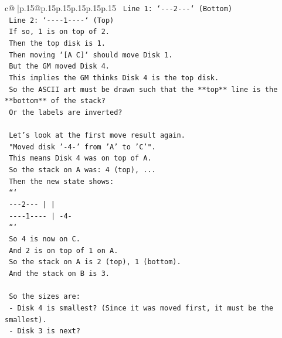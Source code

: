 \documentclass{article}
\begin{document}
{\begin{supertabular}{c@{$\;$}|p{.15\linewidth}@{}p{.15\linewidth}p{.15\linewidth}p{.15\linewidth}p{.15\linewidth}p{.15\linewidth}}
{{{\texttt{                Line 1: `{-}{-}{-}2{-}{-}{-}` (Bottom)} \\
\texttt{                Line 2: `{-}{-}{-}{-}1{-}{-}{-}{-}` (Top)} \\
\texttt{                If so, 1 is on top of 2.} \\
\texttt{                Then the top disk is 1.} \\
\texttt{                Then moving `{[}A C{]}` should move Disk 1.} \\
\texttt{                But the GM moved Disk 4.} \\
\texttt{                This implies the GM thinks Disk 4 is the top disk.} \\
\texttt{                So the ASCII art must be drawn such that the **top** line is the **bottom** of the stack?} \\
\texttt{                Or the labels are inverted?} \\
\\ 
\texttt{                Let's look at the first move result again.} \\
\texttt{                "Moved disk '{-}4{-}' from 'A' to 'C'".} \\
\texttt{                This means Disk 4 was on top of A.} \\
\texttt{                So the stack on A was: 4 (top), ...} \\
\texttt{                Then the new state shows:} \\
\texttt{                ```} \\
\texttt{                {-}{-}{-}2{-}{-}{-}      |         |    } \\
\texttt{                {-}{-}{-}{-}1{-}{-}{-}{-}     |        {-}4{-}   } \\
\texttt{                ```} \\
\texttt{                So 4 is now on C.} \\
\texttt{                And 2 is on top of 1 on A.} \\
\texttt{                So the stack on A is 2 (top), 1 (bottom).} \\
\texttt{                And the stack on B is 3.} \\
\\ 
\texttt{                So the sizes are:} \\
\texttt{                {-} Disk 4 is smallest? (Since it was moved first, it must be the smallest).} \\
\texttt{                {-} Disk 3 is next?} \\
}}}
\end{supertabular}}
\end{document}
